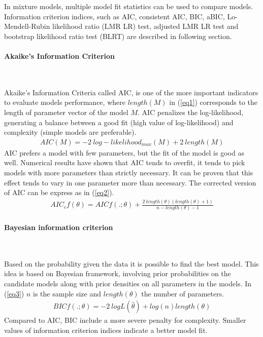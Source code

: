 \documentclass[12pt,a4paper,oneside]{reedthesis}
\begin{document}
In mixture models, multiple model fit statistics can be used to compare models. Information criterion indices, such as AIC, consistent AIC, BIC, aBIC, Lo-Mendell-Rubin likelihood ratio (LMR LR) test, adjusted LMR LR test and bootstrap likelihood ratio test (BLRT) are described in following section.

\hypertarget{akaikes-information-criterion}{%
\paragraph{Akaike's Information Criterion}\label{akaikes-information-criterion}}

~

Akaike's Information Criteria called AIC, is one of the more important indicators to evaluate models performance, where \(length(M)\) in (\ref{eq1}) corresponds to the length of parameter vector of the model \(M\). AIC penalizes the log-likelihood, generating a balance between a good fit (high value of log-likelihood) and complexity (simple models are preferable).
\begin{align}
AIC(M) = -2 \: log-likelihood_{max}(M) + 2 \:length(M) \label{eq1}
\end{align}
AIC prefers a model with few parameters, but the fit of the model is good as well. Numerical results have shown that AIC tends to overfit, it tends to pick models with more parameters than strictly necessary. It can be proven that this effect tends to vary in one parameter more than necessary. The corrected version of AIC can be express as in (\ref{eq2}).
\begin{align}
AIC_c{f(\theta)} = AIC{f(.;\theta)} + \frac{2 \: length(\theta)(length(\theta)+1)}{n-length(\theta) - 1} \label{eq2}
\end{align}
\hypertarget{bayesian-information-criterion}{%
\paragraph{Bayesian information criterion}\label{bayesian-information-criterion}}

~

Based on the probability given the data it is possible to find the best model. This idea is based on Bayesian framework, involving prior probabilities on the candidate models along with prior densities on all parameters in the models. In (\ref{eq3}) \(n\) is the sample size and \(length(\theta)\) the number of parameters.
\begin{align}
BIC{f(.;\theta)} = -2 \: logL(\hat\theta)+log(n)length(\theta) \label{eq3}
\end{align}
Compared to AIC, BIC include a more severe penalty for complexity. Smaller values of information criterion indices indicate a better model fit.
\end{document}
